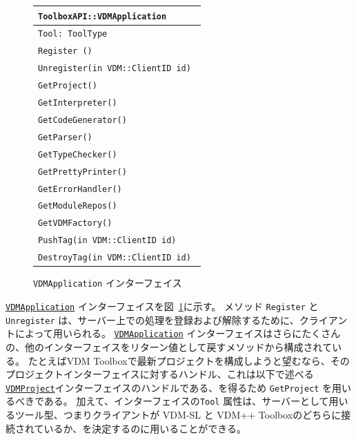 \documentclass[\pformat,12pt]{jarticle}
\newcommand{\VDMApplication}{\hyperlink{interface.VDMApplication}{VDMApplication}}
\newcommand{\VDMProject}{\hyperlink{interface.VDMProject}{VDMProject}}
\begin{document}

\begin{figure}[tbh]
\begin{center}
\begin{tabular}{|l|}
\hline
{\tt ToolboxAPI::VDMApplication } \\
\hline
{\tt Tool: ToolType } \\
\hline
{\tt Register () } \\
{\tt Unregister(in VDM::ClientID id) } \\
{\tt GetProject() }\\
{\tt GetInterpreter() }\\
{\tt GetCodeGenerator() }\\
{\tt GetParser() }\\
{\tt GetTypeChecker() }\\
{\tt  GetPrettyPrinter() }\\
{\tt GetErrorHandler() }\\
{\tt GetModuleRepos() }\\
{\tt GetVDMFactory() }\\
{\tt PushTag(in VDM::ClientID id) }\\
{\tt DestroyTag(in VDM::ClientID id) }\\
\hline
\end{tabular}
\caption{{\tt VDMApplication} インターフェイス}\label{fig:VDMApplication}
\end{center}
\end{figure}

 {\tt \VDMApplication} インターフェイスを図~\ref{fig:VDMApplication}に示す。  
メソッド {\tt Register} と {\tt  Unregister} は、サーバー上での処理を登録および解除するために、クライアントによって用いられる。
 {\tt \VDMApplication} インターフェイスはさらにたくさんの、他のインターフェイスをリターン値として戻すメソッドから構成されている。
たとえばVDM Toolboxで最新プロジェクトを構成しようと望むなら、そのプロジェクトインターフェイスに対するハンドル、これは以下で述べる {\tt \VDMProject}インターフェイスのハンドルである、を得るため {\tt GetProject} を用いるべきである。
加えて、インターフェイスの{\tt Tool} 属性は、サーバーとして用いるツール型、つまりクライアントが VDM-SL と VDM++ Toolboxのどちらに接続されているか、を決定するのに用いることができる。
\end{document}
